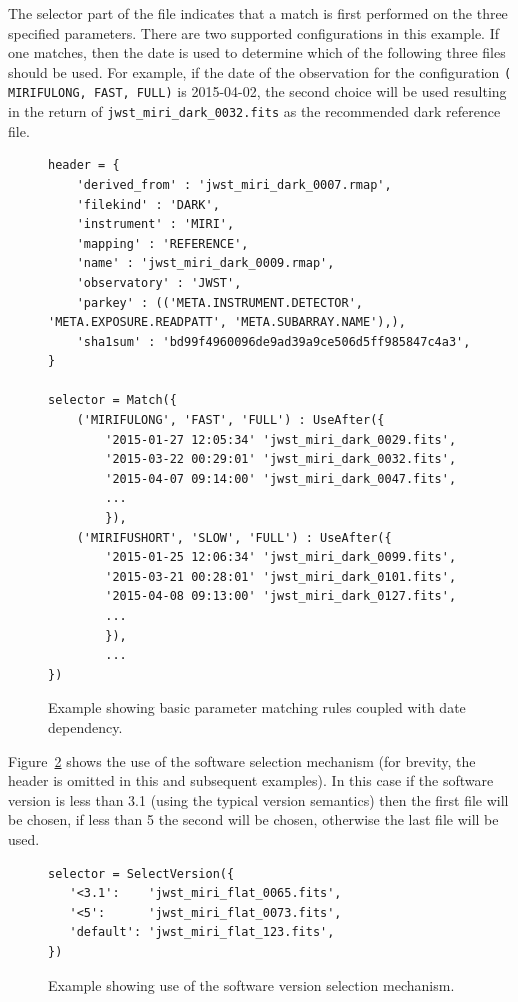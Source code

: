 \documentclass[final,authoryear,5p,times,twocolumn]{elsarticle}
\begin{document}
The selector part of the file indicates that a match is first performed on the 
three specified parameters. There are two supported configurations in this example.
If one matches, then the date is used to determine which of the following three files
should be used.
For example, if the date of the observation for the configuration {\tt (\textquotesingle 
MIRIFULONG\textquotesingle , \textquotesingle FAST\textquotesingle , 
\textquotesingle FULL\textquotesingle )} is 2015-04-02, the second choice 
will be used resulting in the return of {\tt jwst\_miri\_dark\_0032.fits} 
as the recommended dark reference file.

\begin{figure}
\begin{verbatim}
header = {
    'derived_from' : 'jwst_miri_dark_0007.rmap',
    'filekind' : 'DARK',
    'instrument' : 'MIRI',
    'mapping' : 'REFERENCE',
    'name' : 'jwst_miri_dark_0009.rmap',
    'observatory' : 'JWST',
    'parkey' : (('META.INSTRUMENT.DETECTOR', 'META.EXPOSURE.READPATT', 'META.SUBARRAY.NAME'),),
    'sha1sum' : 'bd99f4960096de9ad39a9ce506d5ff985847c4a3',
}

selector = Match({
    ('MIRIFULONG', 'FAST', 'FULL') : UseAfter({
        '2015-01-27 12:05:34' 'jwst_miri_dark_0029.fits',
        '2015-03-22 00:29:01' 'jwst_miri_dark_0032.fits',
        '2015-04-07 09:14:00' 'jwst_miri_dark_0047.fits',
        ...
        }),
    ('MIRIFUSHORT', 'SLOW', 'FULL') : UseAfter({
        '2015-01-25 12:06:34' 'jwst_miri_dark_0099.fits',
        '2015-03-21 00:28:01' 'jwst_miri_dark_0101.fits',
        '2015-04-08 09:13:00' 'jwst_miri_dark_0127.fits',
        ...
        }),
        ...
})
\end{verbatim}
\caption{Example showing basic parameter matching rules coupled with date dependency.}
\label{fig:example1}
\end{figure}

Figure~\ref{fig:example2} shows the use of the software selection mechanism (for brevity, the header is omitted in this and subsequent examples). In this case if the software version is less than 3.1 (using the typical version semantics) then the first file will be chosen, if less than 5 the second will be chosen, otherwise the last file will be used.

\begin{figure}
\begin{verbatim}
selector = SelectVersion({
   '<3.1':    'jwst_miri_flat_0065.fits',
   '<5':      'jwst_miri_flat_0073.fits',
   'default': 'jwst_miri_flat_123.fits',
})
\end{verbatim}
\caption{Example showing use of the software version selection mechanism.}
\label{fig:example2}
\end{figure}
\end{document}

